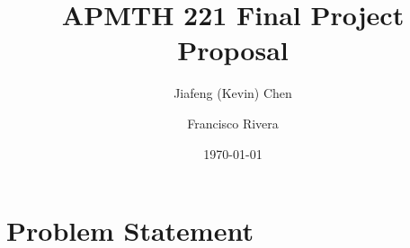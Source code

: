 \documentclass[a4paper]{amsart}
\begin{document}
\title{APMTH 221 Final Project Proposal}
\author{Jiafeng (Kevin) Chen \and Francisco Rivera}
\date{\today}

\maketitle

\section{Problem Statement}
\end{document}
